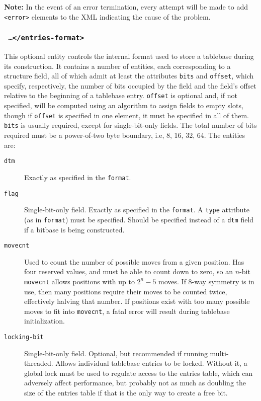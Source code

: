 \documentclass[11pt]{article}
\begin{document}
{\bf Note:} In the event of an error termination, every attempt will
be made to add {\tt <error>} elements to the XML indicating the
cause of the problem.

\subsubsection{\tt <entries-format> \ldots\quad </entries-format>}

This optional entity controls the internal format used to store a
tablebase during its construction.  It contains a number of entities,
each corresponding to a structure field, all of which admit at least
the attributes {\tt bits} and {\tt offset}, which specify,
respectively, the number of bits occupied by the field and the field's
offset relative to the beginning of a tablebase entry.  {\tt offset}
is optional and, if not specified, will be computed using an algorithm
to assign fields to empty slots, though if {\tt offset} is specified
in one element, it must be specified in all of them. {\tt bits} is
usually required, except for single-bit-only fields.  The total number
of bits required must be a power-of-two byte boundary, i.e, 8, 16, 32,
64.  The entities are:

\begin{description}

\item[{\tt dtm}] Exactly as specified in the {\tt format}.

\item[{\tt flag}] Single-bit-only field.  Exactly as specified in the
{\tt format}.  A {\tt type} attribute (as in {\tt format}) must be
specified.  Should be specified instead of a {\tt dtm} field if a
bitbase is being constructed.

\item[{\tt movecnt}] Used to count the number of possible moves from a
given position.  Has four reserved values, and must be able to count
down to zero, so an $n$-bit {\tt movecnt} allows positions with up to
$2^n-5$ moves.  If 8-way symmetry is in use, then many positions
require their moves to be counted twice, effectively halving that
number.  If positions exist with too many possible moves to fit into
{\tt movecnt}, a fatal error will result during tablebase
initialization.

\item[{\tt locking-bit}] Single-bit-only field.  Optional, but
recommended if running multi-threaded.  Allows individual tablebase
entries to be locked.  Without it, a global lock must be used to
regulate access to the entries table, which can adversely affect
performance, but probably not as much as doubling the size of the
entries table if that is the only way to create a free bit.

\end{description}
\end{document}
